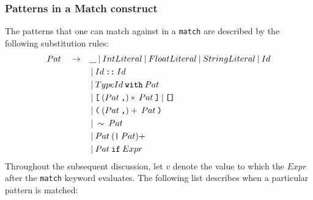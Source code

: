 \documentclass[a4paper, 12pt]{article}
\newcommand{\sepbar}{\: | \:}	%
\newcommand{\substo}{\quad\rightarrow\quad}
\newcommand{\uscore}{\underline{\hspace{0.3cm}}}
\begin{document}
\subsubsection{Patterns in a Match construct}\label{expr:pat}
The patterns that one can match against in a \texttt{match} are described by the following substitution rules:
\begin{align*}
Pat \substo& \uscore \sepbar IntLiteral\sepbar FloatLiteral\sepbar StringLiteral\sepbar Id \\
& \sepbar Id\:\texttt{::}\: Id\\
& \sepbar TypeId \: \texttt{with}\: Pat\\
& \sepbar \texttt{[} \: ( Pat\:\texttt{,})*\: Pat \: \texttt{]} \sepbar \texttt{[]}\\
& \sepbar \texttt{(} \: ( Pat\:\texttt{,})+\: Pat\: \texttt{)}\\
& \sepbar \sim\:Pat\\
& \sepbar Pat\: (\texttt{|}\: Pat)+\\
& \sepbar Pat\:\texttt{if}\: Expr
\end{align*}
Throughout the subsequent discussion, let $v$ denote the value to which the $Expr$ after the \texttt{match} keyword evaluates. The following list describes when a particular pattern is matched:
\end{document}
